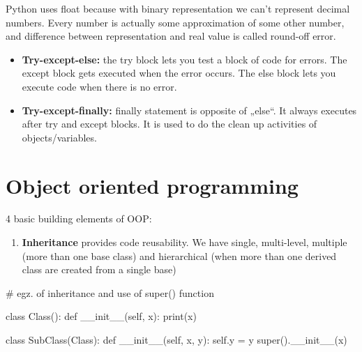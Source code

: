 \documentclass[
  letterpaper,
  DIV=11,
  numbers=noendperiod]{scrreprt}
\newenvironment{Shaded}{\begin{snugshade}}{\end{snugshade}}
\newcommand{\BuiltInTok}[1]{\textcolor[rgb]{0.00,0.23,0.31}{#1}}
\newcommand{\CommentTok}[1]{\textcolor[rgb]{0.37,0.37,0.37}{#1}}
\newcommand{\FunctionTok}[1]{\textcolor[rgb]{0.28,0.35,0.67}{#1}}
\newcommand{\KeywordTok}[1]{\textcolor[rgb]{0.00,0.23,0.31}{#1}}
\newcommand{\NormalTok}[1]{\textcolor[rgb]{0.00,0.23,0.31}{#1}}
\newcommand{\OperatorTok}[1]{\textcolor[rgb]{0.37,0.37,0.37}{#1}}
\newcommand{\VariableTok}[1]{\textcolor[rgb]{0.07,0.07,0.07}{#1}}
\providecommand{\tightlist}{%
  \setlength{\itemsep}{0pt}\setlength{\parskip}{0pt}}\usepackage{longtable,booktabs,array}
\begin{document}
\begin{tcolorbox}[enhanced jigsaw, opacitybacktitle=0.6, colback=white, bottomrule=.15mm, coltitle=black, opacityback=0, breakable, rightrule=.15mm, colframe=quarto-callout-note-color-frame, arc=.35mm, titlerule=0mm, colbacktitle=quarto-callout-note-color!10!white, toptitle=1mm, bottomtitle=1mm, leftrule=.75mm, toprule=.15mm, title=\textcolor{quarto-callout-note-color}{\faInfo}\hspace{0.5em}{Note}, left=2mm]

Python uses float because with binary representation we can't represent
decimal numbers. Every number is actually some approximation of some
other number, and difference between representation and real value is
called round-off error.

\end{tcolorbox}

\begin{itemize}
\tightlist
\item
  \textbf{Try-except-else:} the try block lets you test a block of code
  for errors. The except block gets executed when the error occurs. The
  else block lets you execute code when there is no error.
\item
  \textbf{Try-except-finally:} finally statement is opposite of „else``.
  It always executes after try and except blocks. It is used to do the
  clean up activities of objects/variables.
\end{itemize}

\hypertarget{object-oriented-programming}{%
\section{Object oriented
programming}\label{object-oriented-programming}}

4 basic building elements of OOP:

\begin{enumerate}
\def\labelenumi{\alph{enumi})}
\tightlist
\item
  \textbf{Inheritance} provides code reusability. We have single,
  multi-level, multiple (more than one base class) and hierarchical
  (when more than one derived class are created from a single base)
\end{enumerate}

\begin{Shaded}
\begin{Highlighting}[]
\CommentTok{\# egz. of inheritance and use of super() function}

\KeywordTok{class}\NormalTok{ Class():}
    \KeywordTok{def} \FunctionTok{\_\_init\_\_}\NormalTok{(}\VariableTok{self}\NormalTok{, x):}
        \BuiltInTok{print}\NormalTok{(x)}

\KeywordTok{class}\NormalTok{ SubClass(Class):}
    \KeywordTok{def} \FunctionTok{\_\_init\_\_}\NormalTok{(}\VariableTok{self}\NormalTok{, x, y):}
        \VariableTok{self}\NormalTok{.y }\OperatorTok{=}\NormalTok{ y}
        \BuiltInTok{super}\NormalTok{().}\FunctionTok{\_\_init\_\_}\NormalTok{(x) }
\end{Highlighting}
\end{Shaded}
\end{document}
